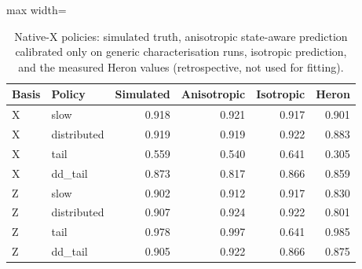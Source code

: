 \begin{table}[t]
\centering
\caption{Native-X policies: simulated truth, anisotropic state-aware prediction calibrated only on generic characterisation runs, isotropic prediction, and the measured Heron values (retrospective, not used for fitting).}\label{tab:c5}
\footnotesize
\begin{adjustbox}{max width=\columnwidth}
\begin{tabular}{llrrrr}
\toprule
Basis & Policy & Simulated & Anisotropic & Isotropic & Heron \\
\midrule
X & slow & 0.918 & 0.921 & 0.917 & 0.901 \\
X & distributed & 0.919 & 0.919 & 0.922 & 0.883 \\
X & tail & 0.559 & 0.540 & 0.641 & 0.305 \\
X & dd\_tail & 0.873 & 0.817 & 0.866 & 0.859 \\
Z & slow & 0.902 & 0.912 & 0.917 & 0.830 \\
Z & distributed & 0.907 & 0.924 & 0.922 & 0.801 \\
Z & tail & 0.978 & 0.997 & 0.641 & 0.985 \\
Z & dd\_tail & 0.905 & 0.922 & 0.866 & 0.875 \\
\bottomrule
\end{tabular}
\end{adjustbox}
\end{table}

